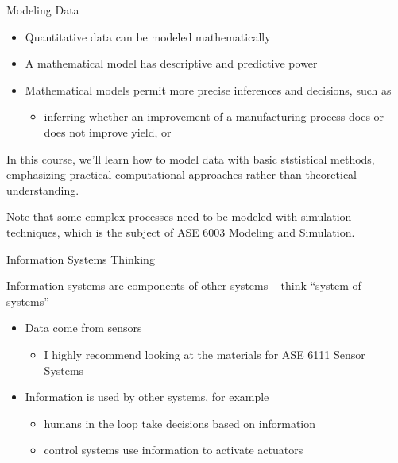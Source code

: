 \documentclass{beamer}
\begin{document}
\begin{frame}{Modeling Data}

\begin{itemize}
\item Quantitative data can be modeled mathematically
\item A mathematical model has descriptive and predictive power
\item Mathematical models permit more precise inferences and
  decisions, such as
\begin{itemize}
\item inferring whether an improvement of a manufacturing process does
  or does not improve yield, or
\end{itemize}
\end{itemize}

In this course, we'll learn how to model data with basic ststistical
methods, emphasizing practical computational approaches rather than
theoretical understanding.

Note that some complex processes need to be modeled with simulation
techniques, which is the subject of ASE 6003 Modeling and Simulation.

\end{frame}

\begin{frame}{Information Systems Thinking}

Information systems are components of other systems -- think ``system
of systems''

\begin{itemize}
\item Data come from sensors
\begin{itemize}
\item I highly recommend looking at the materials for ASE 6111 Sensor Systems
\end{itemize}
\item Information is used by other systems, for example
\begin{itemize}
\item humans in the loop take decisions based on information
\item control systems use information to activate actuators
\end{itemize}
\end{itemize}

\end{frame}
\end{document}
